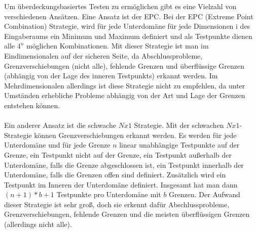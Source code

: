 Um überdeckungsbasiertes Testen zu ermöglichen gibt es eine Vielzahl von verschiedenen Ansätzen.
Eine Ansatz ist der EPC. Bei der EPC (Extreme Point Combination) Strategie, wird für jede Unterdomäne für jede Dimensionen i des Eingaberaums ein Minimum und Maximum definiert und als Testpunkte dienen alle $4^n$ möglichen Kombinationen. 
Mit dieser Strategie ist man im Eindimensionalen auf der sicheren Seite, da Abschlussprobleme, Grenzverschiebungen (nicht alle), fehlende Grenzen und überflüssige Grenzen (abhängig von der Lage des inneren Testpunkts) erkannt werden. Im Mehrdimensionalen allerdings ist diese Strategie nicht zu empfehlen, da unter Umständen erhebliche Probleme abhängig von der Art und Lage der Grenzen entstehen können.
\\\\
Ein anderer Ansatz ist die schwache $Nx1$ Strategie. Mit der schwachen $Nx1$-Strategie können Grenzverschiebungen erkannt werden. Es werden für jede Unterdomäne und für jede Grenze $n$ linear unabhängige Testpunkte auf der Grenze, ein Testpunkt nicht auf der Grenze, ein Testpunkt außerhalb der Unterdomäne, falls die Grenze abgeschlossen ist, ein Testpunkt innerhalb der Unterdomäne, falls die Grenzen offen sind definiert. Zusätzlich wird ein Testpunkt im Inneren der Unterdomäne definiert. Insgesamt hat man dann $(n+1)*b+1$ Testpunkte pro Unterdomäne mit $b$ Grenzen. Der Aufwand dieser Strategie ist sehr groß, doch sie erkennt dafür Abschlussprobleme, Grenzverschiebungen, fehlende Grenzen und die meisten überflüssigen Grenzen (allerdings nicht alle).